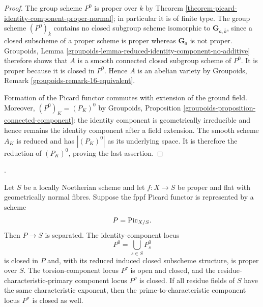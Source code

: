 \begin{proof}
The group scheme $P^0$ is proper over $k$ by Theorem
\ref{theorem-picard-identity-component-proper-normal}; in particular it is of
finite type. The group scheme $(P^0)_{\overline{k}}$ contains no closed
subgroup scheme isomorphic to $\mathbf{G}_{a,\overline{k}}$, since a closed
subscheme of a proper scheme is proper whereas $\mathbf{G}_a$ is not proper.
Groupoids, Lemma
\ref{groupoids-lemma-reduced-identity-component-no-additive} therefore shows
that $A$ is a smooth connected closed subgroup scheme of $P^0$. It is proper
because it is closed in $P^0$. Hence $A$ is an abelian variety by Groupoids,
Remark \ref{groupoids-remark-16-equivalent}.

Formation of the Picard functor commutes with extension of the ground field.
Moreover, $(P^0)_K=(P_K)^0$ by Groupoids, Proposition
\ref{groupoids-proposition-connected-component}: the identity component is
geometrically irreducible and hence remains the identity component after a
field extension. The smooth scheme $A_K$ is reduced and has $|(P_K)^0|$ as
its underlying space. It is therefore the reduction of $(P_K)^0$, proving
the last assertion.
\end{proof}

\begin{theorem}
\label{theorem-picard-normal-relative-components}
\begin{reference}
\cite[Expos\'e 236, Corollary 2.3, p. 232]{FGA}.
\end{reference}
Let $S$ be a locally Noetherian scheme and let $f:X\to S$ be proper and
flat with geometrically normal fibres. Suppose the fppf Picard functor is
represented by a scheme
$$
P=\mathrm{Pic}_{X/S}.
$$
Then $P\to S$ is separated. The identity-component locus
$$
P^0=\bigcup_{s\in S}P_s^0
$$
is closed in $P$ and, with its reduced induced closed subscheme structure,
is proper over $S$. The torsion-component locus $P^\tau$ is open and closed,
and the residue-characteristic-primary component locus $P^\rho$ is closed.
If all residue fields of $S$ have the same characteristic exponent, then the
prime-to-characteristic component locus $P^\sigma$ is closed as well.
\end{theorem}

